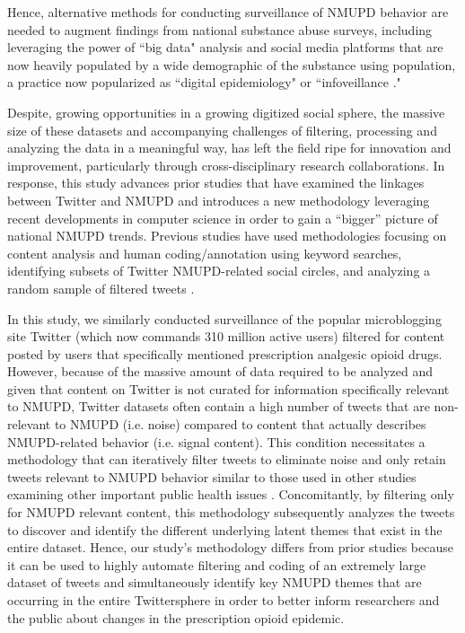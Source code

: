 Hence, alternative methods for conducting surveillance of NMUPD 
behavior are needed to augment findings from national substance abuse 
surveys, including leveraging the power of ``big data" analysis and social media 
platforms that are now heavily populated by a wide demographic of the substance 
using population, a practice now popularized as ``digital epidemiology" or 
``infoveillance \cite{salathe2012digital}."

Despite, growing opportunities in a growing digitized social sphere, 
the massive size of these datasets and accompanying challenges of filtering, 
processing and analyzing the data in a meaningful way, has left the field ripe for 
innovation and improvement, particularly through cross-disciplinary research 
collaborations. In response, this study advances prior studies that have examined 
the linkages between Twitter and NMUPD and introduces a new methodology 
leveraging recent developments in computer science in order to gain a 
“bigger” picture of national NMUPD trends. Previous studies have used 
methodologies focusing on content analysis and human coding/annotation 
using keyword searches, identifying subsets of Twitter NMUPD-related 
social circles, and analyzing a random sample of filtered tweets 
\cite{hanson2013tweaking,hanson2013exploration,katsuki2015establishing,shutler2015drug}.

In this study, we similarly conducted surveillance of the popular 
microblogging site Twitter (which now commands 310 million active users) 
filtered for content posted by users that specifically mentioned 
prescription analgesic opioid drugs. However, because of the massive amount 
of data required to be analyzed and given that content on Twitter is not 
curated for information specifically relevant to NMUPD, Twitter datasets 
often contain a high number of tweets that are non-relevant to NMUPD 
(i.e. noise) compared to content that actually describes NMUPD-related 
behavior (i.e. signal content). This condition necessitates a methodology 
that can iteratively filter tweets to eliminate noise and only 
retain tweets relevant to NMUPD behavior similar to those used in 
other studies examining other important public health issues 
\cite{chen2014flu,prier2011identifying}. Concomitantly, by 
filtering only for NMUPD relevant content, this methodology 
subsequently analyzes the tweets to discover and identify the 
different underlying latent themes that exist in the entire dataset. 
Hence, our study's methodology differs from prior studies because 
it can be used to highly automate filtering and coding of an 
extremely large dataset of tweets and simultaneously 
identify key NMUPD themes that are occurring in the entire 
Twittersphere in order to better inform researchers and 
the public about changes in the prescription opioid epidemic.


